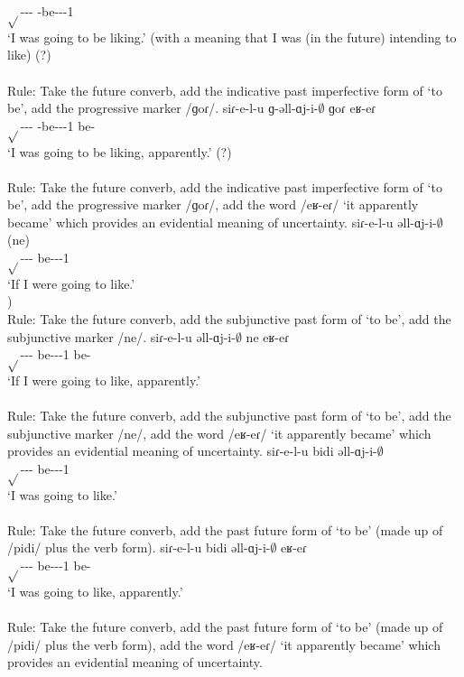 \begin{exe}
\begin{xlist}
		$\sqrt{}$-{\thgloss}-{\infgloss}-{\futcvb} {\ind}-be-{\thgloss}-{\pst}-1{\sg} {\prog} \\
		\trans `I was going to be liking.' (with a meaning that I was (in the future) intending to like) (?) \\
		 \\
		Rule: Take the future converb, add the indicative past imperfective form of `to be', add the progressive marker /ɡoɾ/. 
		\ex \gll siɾ-e-l-u ɡ-əll-ɑj-i-$\emptyset$ ɡoɾ eʁ-eɾ \\
		$\sqrt{}$-{\thgloss}-{\infgloss}-{\futcvb} {\ind}-be-{\thgloss}-{\pst}-1{\sg} {\prog} be-{\eptcp} \\
		\trans `I was going to be liking, apparently.' (?) \\
		 \\
		Rule: Take the future converb, add the indicative past imperfective form of `to be', add the progressive marker /ɡoɾ/, add the word /eʁ-eɾ/ `it apparently became' which provides an evidential meaning of uncertainty.
		\ex \gll siɾ-e-l-u əll-ɑj-i-$\emptyset$ (ne) \\
		$\sqrt{}$-{\thgloss}-{\infgloss}-{\futcvb} be-{\thgloss}-{\pst}-1{\sg} {\sbjv} \\
		\trans `If I were going to like.' \\
		) \\
		Rule: Take the future converb, add the subjunctive past form of `to be', add the subjunctive marker /ne/.
		\ex \gll siɾ-e-l-u əll-ɑj-i-$\emptyset$ ne eʁ-eɾ \\
		$\sqrt{}$-{\thgloss}-{\infgloss}-{\futcvb} be-{\thgloss}-{\pst}-1{\sg} {\sbjv} be-{\eptcp} \\
		\trans `If I were going to like, apparently.' \\
		 \\
		Rule: Take the future converb, add the subjunctive past form of `to be', add the subjunctive marker /ne/, add the word /eʁ-eɾ/ `it apparently became' which provides an evidential meaning of uncertainty.
		\ex \gll siɾ-e-l-u bidi əll-ɑj-i-$\emptyset$ \\
		$\sqrt{}$-{\thgloss}-{\infgloss}-{\futcvb} {\futcvb} be-{\thgloss}-{\pst}-1{\sg} \\
		\trans `I was going to like.' \\
		 \\
		Rule: Take the future converb, add the past future form of `to be' (made up of /pidi/ plus the verb form). 
		\ex \gll siɾ-e-l-u bidi əll-ɑj-i-$\emptyset$ eʁ-eɾ \\
		$\sqrt{}$-{\thgloss}-{\infgloss}-{\futcvb} {\futcvb} be-{\thgloss}-{\pst}-1{\sg} be-{\eptcp} \\
		\trans `I was going to like, apparently.' \\
		 \\
		Rule: Take the future converb, add the past future form of `to be' (made up of /pidi/ plus the verb form), add the word /eʁ-eɾ/ `it apparently became' which provides an evidential meaning of uncertainty. 
 

\end{xlist}
\end{exe}
